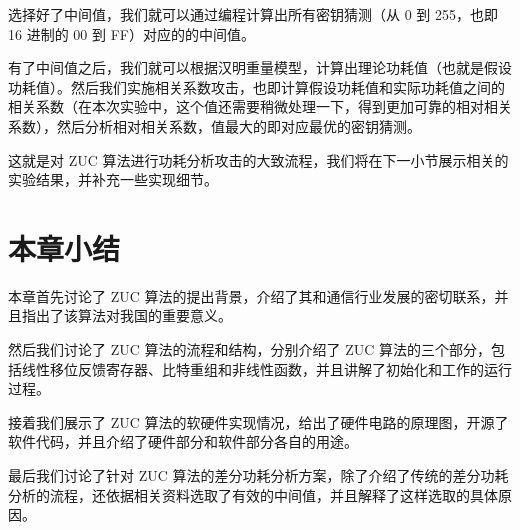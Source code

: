 \vspace*{\baselineskip}

选择好了中间值，我们就可以通过编程计算出所有密钥猜测（从 0 到 255，也即 16 进制的 00 到 FF）对应的的中间值。

有了中间值之后，我们就可以根据汉明重量模型，计算出理论功耗值（也就是假设功耗值）。然后我们实施相关系数攻击，也即计算假设功耗值和实际功耗值之间的相关系数（在本次实验中，这个值还需要稍微处理一下，得到更加可靠的相对相关系数），然后分析相对相关系数，值最大的即对应最优的密钥猜测。

这就是对 ZUC 算法进行功耗分析攻击的大致流程，我们将在下一小节展示相关的实验结果，并补充一些实现细节。

\section{本章小结}

本章首先讨论了 ZUC 算法的提出背景，介绍了其和通信行业发展的密切联系，并且指出了该算法对我国的重要意义。

然后我们讨论了 ZUC 算法的流程和结构，分别介绍了 ZUC 算法的三个部分，包括线性移位反馈寄存器、比特重组和非线性函数，并且讲解了初始化和工作的运行过程。

接着我们展示了 ZUC 算法的软硬件实现情况，给出了硬件电路的原理图，开源了软件代码，并且介绍了硬件部分和软件部分各自的用途。

最后我们讨论了针对 ZUC 算法的差分功耗分析方案，除了介绍了传统的差分功耗分析的流程，还依据相关资料选取了有效的中间值，并且解释了这样选取的具体原因。
